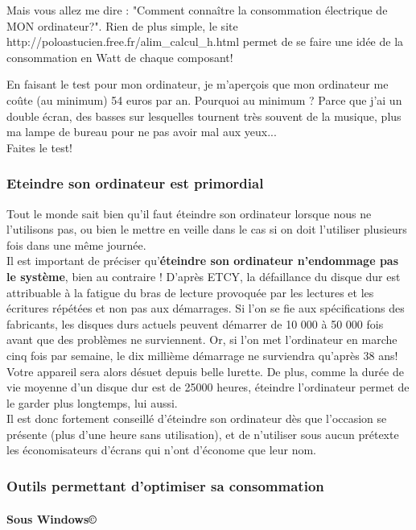 \documentclass[a4paper,11pt,french]{article}
\begin{document}
Mais vous allez me dire : "Comment connaître la consommation électrique de MON ordinateur?". Rien de plus simple, le site \textsf{http://poloastucien.free.fr/alim\_{}calcul\_{}h.html} permet de se faire une idée de la consommation en Watt de chaque composant!

En faisant le test pour mon ordinateur, je m'aperçois que mon ordinateur me coûte (au minimum) 54 euros par an. Pourquoi au minimum ? Parce que j'ai un double écran, des basses sur lesquelles tournent très souvent de la musique, plus ma lampe de bureau pour ne pas avoir mal aux yeux...\\

Faites le test!

\subsubsection{Eteindre son ordinateur est primordial}
Tout le monde sait bien qu'il faut éteindre son ordinateur lorsque nous ne l'utilisons pas, ou bien le mettre en veille dans le cas si on doit l'utiliser plusieurs fois dans une même journée.\\
Il est important de préciser qu'\textbf{éteindre son ordinateur n'endommage pas le système}, bien au contraire ! D'après ETCY, la défaillance du disque dur est attribuable à la fatigue du bras de lecture provoquée par les lectures et les écritures répétées et non pas aux démarrages. Si l'on se fie aux spécifications des fabricants, les disques durs actuels peuvent démarrer de 10 000 à 50 000 fois avant que des problèmes ne surviennent. Or, si l'on met l'ordinateur en marche cinq fois par semaine, le dix millième démarrage ne surviendra qu'après 38 ans! Votre appareil sera alors désuet depuis belle lurette. De plus, comme la durée de vie moyenne d'un disque dur est de 25000 heures, éteindre l'ordinateur permet de le garder plus longtemps, lui aussi.\\

Il est donc fortement conseillé d'éteindre son ordinateur dès que l'occasion se présente (plus d'une heure sans utilisation), et de n'utiliser sous aucun prétexte les économisateurs d'écrans qui n'ont d'économe que leur nom.



\subsubsection{Outils permettant d'optimiser sa consommation}
\paragraph{Sous Windows\copyright}
\end{document}
